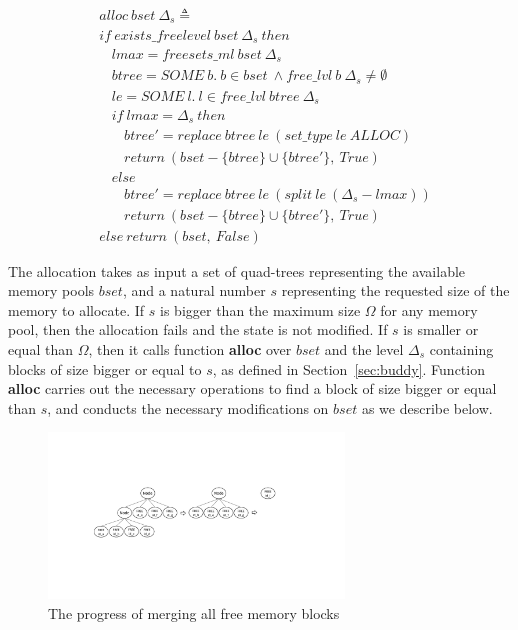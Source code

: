 \begin{definition} 
	\begin{align*}
	&alloc\ bset\ \Delta_s \triangleq \\
	&if\ exists\_freelevel\ bset\ \Delta_s\ then \\
	&\ \ \ \ lmax = freesets\_ml\ bset\ \Delta_s \\
	&\ \ \ \ btree = SOME\ b.\ b \in bset\ \wedge free\_lvl\ b\ \Delta_s  \ne \emptyset \\
	&\ \ \ \ le = SOME\ l.\ l \in free\_lvl\ btree\ \Delta_s  \\
	&\ \ \ \ if\ lmax = \Delta_s\ then \\
	&\ \ \ \ \ \ \ \ btree' = replace\ btree\ le\ (set\_type\ le\ ALLOC) \\
	&\ \ \ \ \ \ \ \ return\ (bset - \lbrace btree \rbrace \cup \lbrace btree' \rbrace,\ True) \\
	&\ \ \ \ else \\
	&\ \ \ \ \ \ \ \ btree' = replace\ btree\ le\ (split\ le\ (\Delta_s  - lmax)) \\
	&\ \ \ \ \ \ \ \ return\ (bset - \lbrace btree \rbrace \cup \lbrace btree' \rbrace,\ True) \\
	&else\ return\ (bset,\ False)
	\end{align*}
\end{definition}


The allocation takes as input a set of quad-trees representing the available memory pools $bset$, and a natural number $s$ representing the requested size of the memory to allocate. If $s$ is bigger than the maximum size $\Omega$ for any memory pool, then the allocation fails and the state is not modified. If $s$ is smaller or equal than $\Omega$, then it calls function \textbf{alloc} over $bset$ and the level $\Delta_s$ containing blocks of size bigger or equal to $s$, as defined in Section~\ref{sec:buddy}. Function \textbf{alloc} carries out the necessary operations to find a block of size bigger or equal than $s$, and conducts the necessary modifications on $bset$ as we describe below.

\begin{figure}[tbp]
\centering
\includegraphics[width=0.7\textwidth]{fig2.pdf}
\caption{The progress of merging all free memory blocks}
\label{fig:merginfreeblocks}
\end{figure}


